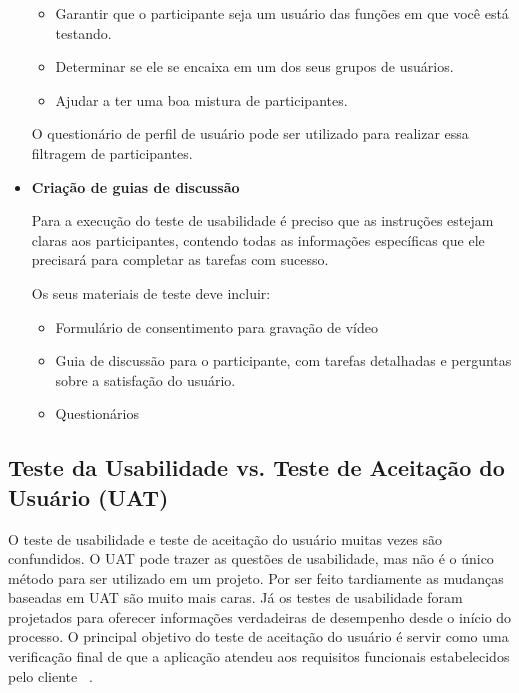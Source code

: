 \begin{itemize}
	\begin{itemize}
	\item Garantir que o participante seja um usuário das funções em que você está testando.
	\item Determinar se ele se encaixa em um dos seus grupos de usuários.
	\item Ajudar a ter uma boa mistura de participantes.
	\end{itemize}

O questionário de perfil de usuário pode ser utilizado para realizar essa filtragem de participantes.


\item \textbf{Criação de guias de discussão}

Para a execução do teste de usabilidade é preciso que as instruções estejam claras aos participantes, contendo todas as informações específicas que ele precisará para completar as tarefas com sucesso.

Os seus materiais de teste deve incluir:

	\begin{itemize}
		\item Formulário de consentimento para gravação de vídeo
		\item Guia de discussão para o participante, com tarefas detalhadas e perguntas sobre a satisfação do usuário.
		\item Questionários
	\end{itemize}

\end{itemize}


\subsection{Teste da Usabilidade vs. Teste de Aceitação do Usuário (UAT)}


O teste de usabilidade e teste de aceitação do usuário muitas vezes são confundidos. O UAT pode trazer as questões de usabilidade, mas não é o único método para ser utilizado em um projeto. Por ser feito tardiamente as mudanças baseadas em UAT são muito mais caras. Já os testes de usabilidade foram projetados para oferecer informações verdadeiras de desempenho desde o início do processo.  
%
O principal objetivo do teste de aceitação do usuário é servir como uma verificação final de que a aplicação atendeu aos requisitos funcionais estabelecidos pelo cliente ~\cite{preece2007}.




